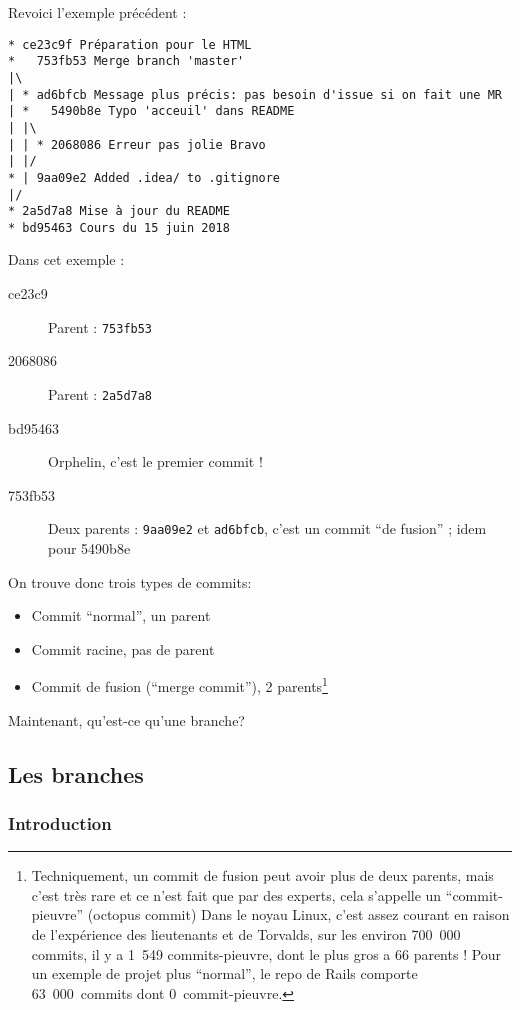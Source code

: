 \documentclass[10pt,a4paper]{article}
\begin{document}
Revoici l'exemple précédent :

\begin{verbatim}
* ce23c9f Préparation pour le HTML
*   753fb53 Merge branch 'master'
|\  
| * ad6bfcb Message plus précis: pas besoin d'issue si on fait une MR
| *   5490b8e Typo 'acceuil' dans README
| |\  
| | * 2068086 Erreur pas jolie Bravo
| |/  
* | 9aa09e2 Added .idea/ to .gitignore
|/  
* 2a5d7a8 Mise à jour du README
* bd95463 Cours du 15 juin 2018
\end{verbatim}

Dans cet exemple :

\begin{description}
\item[ce23c9] Parent : {\tt 753fb53}
\item[2068086] Parent : {\tt 2a5d7a8}
\item[bd95463] Orphelin, c'est le premier commit !
\item[753fb53] Deux parents : {\tt 9aa09e2} et {\tt ad6bfcb}, c'est un commit ``de fusion'' ; idem pour 5490b8e
\end{description}

On trouve donc trois types de commits:

\begin{itemize}
\item Commit ``normal'', un parent
\item Commit racine, pas de parent
\item Commit de fusion (``merge commit''), 2 parents\footnote{Techniquement, un commit de fusion peut avoir plus de deux parents, mais c'est très rare et ce n'est fait que par des experts, cela s'appelle un ``commit-pieuvre'' (octopus commit) Dans le noyau Linux, c'est assez courant en raison de l'expérience des lieutenants et de Torvalds, sur les environ 700~000 commits, il y a 1~549 commits-pieuvre, dont le plus gros a 66 parents ! Pour un exemple de projet plus ``normal'', le repo de Rails comporte 63~000~commits dont 0~commit-pieuvre.}
\end{itemize}

Maintenant, qu'est-ce qu'une branche?

\subsection{Les branches}

\subsubsection{Introduction}
\end{document}
